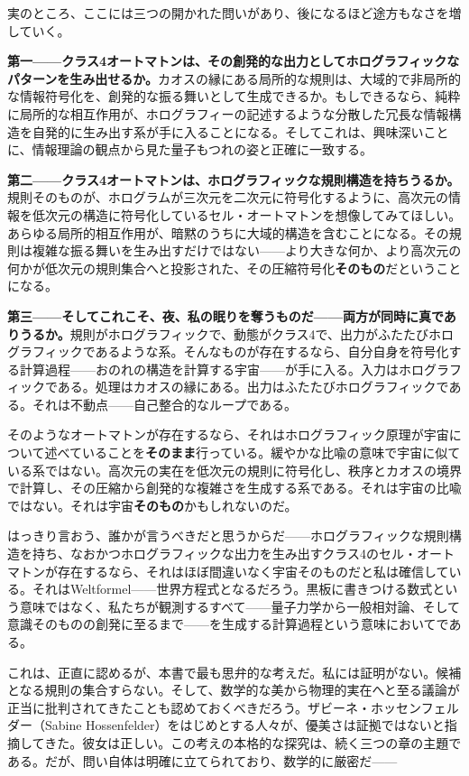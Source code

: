 \documentclass[11pt, twoside, openright]{book}
\begin{document}
実のところ、ここには三つの開かれた問いがあり、後になるほど途方もなさを増していく。

\textbf{第一------クラス4オートマトンは、その創発的な出力としてホログラフィックなパターンを生み出せるか。}カオスの縁にある局所的な規則は、大域的で非局所的な情報符号化を、創発的な振る舞いとして生成できるか。もしできるなら、純粋に局所的な相互作用が、ホログラフィーの記述するような分散した冗長な情報構造を自発的に生み出す系が手に入ることになる。そしてこれは、興味深いことに、情報理論の観点から見た量子もつれの姿と正確に一致する。

\textbf{第二------クラス4オートマトンは、ホログラフィックな規則構造を持ちうるか。}規則そのものが、ホログラムが三次元を二次元に符号化するように、高次元の情報を低次元の構造に符号化しているセル・オートマトンを想像してみてほしい。あらゆる局所的相互作用が、暗黙のうちに大域的構造を含むことになる。その規則は複雑な振る舞いを生み出すだけではない------より大きな何か、より高次元の何かが低次元の規則集合へと投影された、その圧縮符号化\textbf{そのもの}だということになる。

\textbf{第三------そしてこれこそ、夜、私の眠りを奪うものだ------両方が同時に真でありうるか。}規則がホログラフィックで、動態がクラス4で、出力がふたたびホログラフィックであるような系。そんなものが存在するなら、自分自身を符号化する計算過程------おのれの構造を計算する宇宙------が手に入る。入力はホログラフィックである。処理はカオスの縁にある。出力はふたたびホログラフィックである。それは不動点------自己整合的なループである。

そのようなオートマトンが存在するなら、それはホログラフィック原理が宇宙について述べていることを\textbf{そのまま}行っている。緩やかな比喩の意味で宇宙に似ている系ではない。高次元の実在を低次元の規則に符号化し、秩序とカオスの境界で計算し、その圧縮から創発的な複雑さを生成する系である。それは宇宙の比喩ではない。それは宇宙\textbf{そのもの}かもしれないのだ。

はっきり言おう、誰かが言うべきだと思うからだ------ホログラフィックな規則構造を持ち、なおかつホログラフィックな出力を生み出すクラス4のセル・オートマトンが存在するなら、それはほぼ間違いなく宇宙そのものだと私は確信している。それはWeltformel------世界方程式となるだろう。黒板に書きつける数式という意味ではなく、私たちが観測するすべて------量子力学から一般相対論、そして意識そのものの創発に至るまで------を生成する計算過程という意味においてである。

これは、正直に認めるが、本書で最も思弁的な考えだ。私には証明がない。候補となる規則の集合すらない。そして、数学的な美から物理的実在へと至る議論が正当に批判されてきたことも認めておくべきだろう。ザビーネ・ホッセンフェルダー（Sabine Hossenfelder）をはじめとする人々が、優美さは証拠ではないと指摘してきた。彼女は正しい。この考えの本格的な探究は、続く三つの章の主題である。だが、問い自体は明確に立てられており、数学的に厳密だ------
\end{document}
